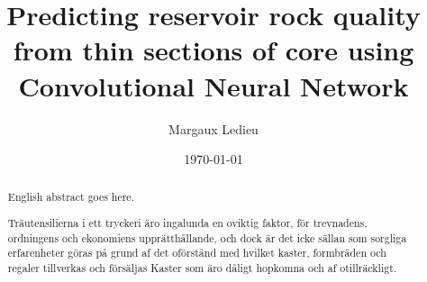 \documentclass{kththesis}
\title{Predicting reservoir rock quality from thin sections of core using Convolutional Neural Network}
\author{Margaux Ledieu}
\date{\today}
\begin{document}
\frontmatter

\titlepage

\begin{abstract}
  English abstract goes here.

  \blindtext
\end{abstract}


\begin{otherlanguage}{swedish}
  \begin{abstract}
    Träutensilierna i ett tryckeri äro ingalunda en oviktig faktor,
    för trevnadens, ordningens och ekonomiens upprätthållande, och
    dock är det icke sällan som sorgliga erfarenheter göras på grund
    af det oförstånd med hvilket kaster, formbräden och regaler
    tillverkas och försäljas Kaster som äro dåligt hopkomna och af
    otillräckligt.
  \end{abstract}
\end{otherlanguage}


\tableofcontents
\cleardoublepage

\listoffigures
\cleardoublepage

\listoftables
\cleardoublepage

\printglossary[type=\acronymtype]
 
\printglossary
{}










\printbibliography[heading=bibintoc] %

\appendix
\end{document}

